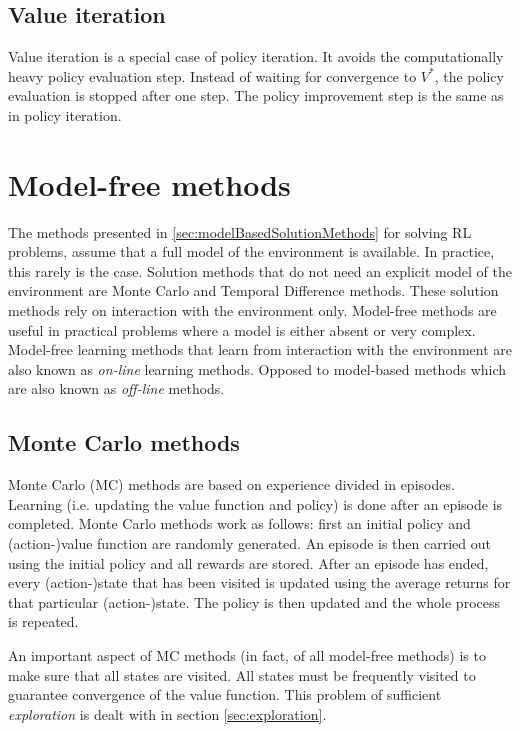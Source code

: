 \documentclass[a4paper,11pt]{mscLiterature}
\begin{document}
			\subsection{Value iteration}
			Value iteration is a special case of policy iteration. It avoids the computationally heavy policy evaluation step. Instead of waiting for convergence to $V^*$, the policy evaluation is stopped after one step. The policy improvement step is the same as in policy iteration.
						
			\section{Model-free methods}\label{sec:modelFreeSolutionMethods}
		The methods presented in \ref{sec:modelBasedSolutionMethods} for solving RL problems, assume that a full model of the environment is available. In practice, this rarely is the case. Solution methods that do not need an explicit model of the environment are Monte Carlo and Temporal Difference methods. These solution methods rely on interaction with the environment only. Model-free methods are useful in practical problems where a model is either absent or very complex. Model-free learning methods that learn from interaction with the environment are also known as \emph{on-line} learning methods. Opposed to model-based methods which are also known as \emph{off-line} methods.
		
		\subsection{Monte Carlo methods}
		Monte Carlo (MC) methods are based on experience divided in episodes. Learning (i.e. updating the value function and policy) is done after an episode is completed. Monte Carlo methods work as follows: first an initial policy and (action-)value function are randomly generated. An episode is then carried out using the initial policy and all rewards are stored. After an episode has ended, every (action-)state that has been visited is updated using the average returns for that particular (action-)state. The policy is then updated and the whole process is repeated. 
		
		An important aspect of MC methods (in fact, of all model-free methods) is to make sure that all states are visited. All states must be frequently visited to guarantee convergence of the value function. This problem of sufficient \emph{exploration} is dealt with in section \ref{sec:exploration}.
		
\end{document}
